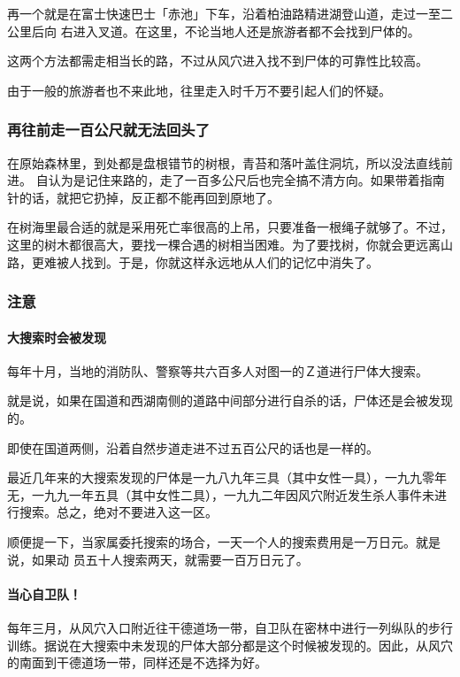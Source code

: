 \documentclass[UTF8]{ctexart}
\begin{document}
再一个就是在富士快速巴士「赤池」下车，沿着柏油路精进湖登山道，走过一至二公里后向
右进入叉道。在这里，不论当地人还是旅游者都不会找到尸体的。

这两个方法都需走相当长的路，不过从风穴进入找不到尸体的可靠性比较高。

由于一般的旅游者也不来此地，往里走入时千万不要引起人们的怀疑。

\subsubsection*{再往前走一百公尺就无法回头了}

在原始森林里，到处都是盘根错节的树根，青苔和落叶盖住洞坑，所以没法直线前进。
自认为是记住来路的，走了一百多公尺后也完全搞不清方向。如果带着指南针的话，就把它扔掉，反正都不能再回到原地了。

在树海里最合适的就是采用死亡率很高的上吊，只要准备一根绳子就够了。不过，这里的树木都很高大，要找一棵合遇的树相当困难。为了要找树，你就会更远离山路，更难被人找到。于是，你就这样永远地从人们的记忆中消失了。

\subsubsection*{注意}

\paragraph*{大搜索时会被发现}

每年十月，当地的消防队、警察等共六百多人对图一的Ｚ道进行尸体大搜索。

就是说，如果在国道和西湖南侧的道路中间部分进行自杀的话，尸体还是会被发现的。

即使在国道两侧，沿着自然步道走进不过五百公尺的话也是一样的。

最近几年来的大搜索发现的尸体是一九八九年三具（其中女性一具），一九九零年无，一九九一年五具（其中女性二具），一九九二年因风穴附近发生杀人事件未进行搜索。总之，绝对不要进入这一区。

顺便提一下，当家属委托搜索的场合，一天一个人的搜索费用是一万日元。就是说，如果动
员五十人搜索两天，就需要一百万日元了。

\paragraph*{当心自卫队！}

每年三月，从风穴入口附近往干德道场一带，自卫队在密林中进行一列纵队的步行训练。据说在大搜索中未发现的尸体大部分都是这个时候被发现的。因此，从风穴的南面到干德道场一带，同样还是不选择为好。
\end{document}
